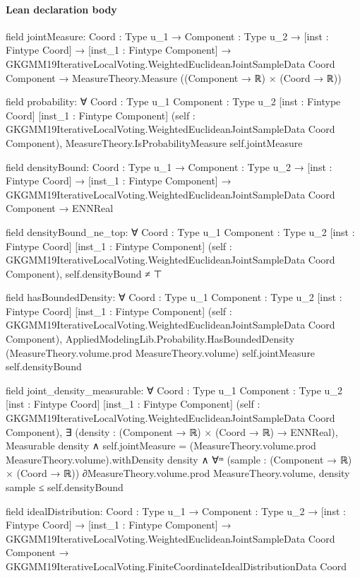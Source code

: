 \documentclass[10pt]{article}
\begin{document}
\paragraph{Lean declaration body}
\begin{ReviewVerbatim}
field jointMeasure:
{Coord : Type u_1} →
  {Component : Type u_2} →
    [inst : Fintype Coord] →
      [inst_1 : Fintype Component] →
        GKGMM19IterativeLocalVoting.WeightedEuclideanJointSampleData Coord Component →
          MeasureTheory.Measure ((Component → ℝ) × (Coord → ℝ))

field probability:
∀ {Coord : Type u_1} {Component : Type u_2} [inst : Fintype Coord] [inst_1 : Fintype Component]
  (self : GKGMM19IterativeLocalVoting.WeightedEuclideanJointSampleData Coord Component),
  MeasureTheory.IsProbabilityMeasure self.jointMeasure

field densityBound:
{Coord : Type u_1} →
  {Component : Type u_2} →
    [inst : Fintype Coord] →
      [inst_1 : Fintype Component] →
        GKGMM19IterativeLocalVoting.WeightedEuclideanJointSampleData Coord Component → ENNReal

field densityBound_ne_top:
∀ {Coord : Type u_1} {Component : Type u_2} [inst : Fintype Coord] [inst_1 : Fintype Component]
  (self : GKGMM19IterativeLocalVoting.WeightedEuclideanJointSampleData Coord Component), self.densityBound ≠ ⊤

field hasBoundedDensity:
∀ {Coord : Type u_1} {Component : Type u_2} [inst : Fintype Coord] [inst_1 : Fintype Component]
  (self : GKGMM19IterativeLocalVoting.WeightedEuclideanJointSampleData Coord Component),
  AppliedModelingLib.Probability.HasBoundedDensity (MeasureTheory.volume.prod MeasureTheory.volume) self.jointMeasure
    self.densityBound

field joint_density_measurable:
∀ {Coord : Type u_1} {Component : Type u_2} [inst : Fintype Coord] [inst_1 : Fintype Component]
  (self : GKGMM19IterativeLocalVoting.WeightedEuclideanJointSampleData Coord Component),
  ∃ (density : (Component → ℝ) × (Coord → ℝ) → ENNReal),
    Measurable density ∧
      self.jointMeasure = (MeasureTheory.volume.prod MeasureTheory.volume).withDensity density ∧
        ∀ᵐ (sample : (Component → ℝ) × (Coord → ℝ)) ∂MeasureTheory.volume.prod MeasureTheory.volume,
          density sample ≤ self.densityBound

field idealDistribution:
{Coord : Type u_1} →
  {Component : Type u_2} →
    [inst : Fintype Coord] →
      [inst_1 : Fintype Component] →
        GKGMM19IterativeLocalVoting.WeightedEuclideanJointSampleData Coord Component →
          GKGMM19IterativeLocalVoting.FiniteCoordinateIdealDistributionData Coord


\end{ReviewVerbatim}
\end{document}
